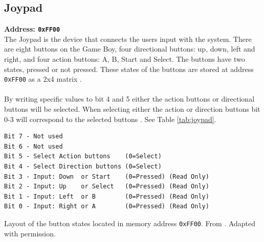 



\subsection{Joypad}
\label{sec:Joypad}
\textbf{Address: \texttt{0xFF00}}
\\
The Joypad is the device that connects the users input with the system. 
There are eight buttons on the Game Boy, four directional buttons: up, down, left and right, and four action buttons: A, B, Start and Select.
The buttons have two states, pressed or not pressed. 
These states of the buttons are stored at address \texttt{0xFF00} as a 2x4 matrix \cite{pandocsjoypad}.
\\\\
By writing specific values to bit 4 and 5 either the action buttons or directional buttons will be selected.
When selecting either the action or direction buttons bit 0-3 will correspond to the selected buttons \cite{pandocsjoypad}. See Table \ref{tab:joypad}.


\begin{table}[H]
    \begin{center}

\begin{BVerbatim}
Bit 7 - Not used
Bit 6 - Not used
Bit 5 - Select Action buttons    (0=Select)
Bit 4 - Select Direction buttons (0=Select)
Bit 3 - Input: Down  or Start    (0=Pressed) (Read Only)
Bit 2 - Input: Up    or Select   (0=Pressed) (Read Only)
Bit 1 - Input: Left  or B        (0=Pressed) (Read Only)
Bit 0 - Input: Right or A        (0=Pressed) (Read Only)
\end{BVerbatim}

    \caption{Layout of the button states located in memory address \texttt{0xFF00}. From \cite{pandocsjoypad}. Adapted with permission.}
    \label{tab:joypad}
    \end{center}
\end{table}

